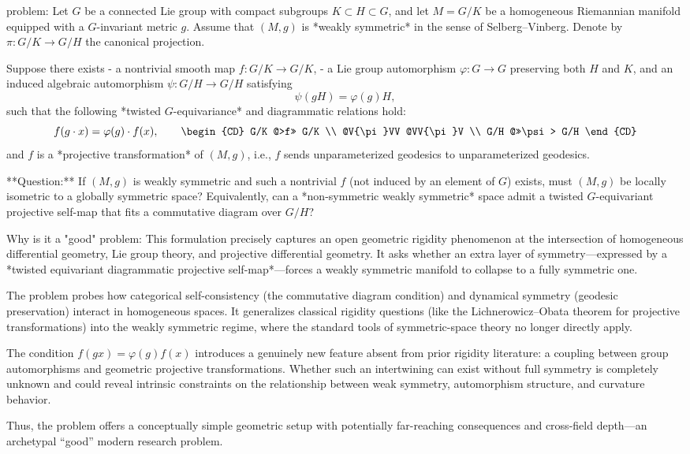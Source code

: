 problem:  
Let \(G\) be a connected Lie group with compact subgroups \(K \subset H \subset G\), and let \(M = G/K\) be a homogeneous Riemannian manifold equipped with a \(G\)-invariant metric \(g\).  
Assume that \((M,g)\) is *weakly symmetric* in the sense of Selberg–Vinberg.  
Denote by \(\pi : G/K \to G/H\) the canonical projection.  

Suppose there exists  
- a nontrivial smooth map \(f: G/K \to G/K\),  
- a Lie group automorphism \(\varphi: G \to G\) preserving both \(H\) and \(K\),  
and an induced algebraic automorphism \(\psi : G/H \to G/H\) satisfying  
\[
\psi(gH) = \varphi(g)H,
\]
such that the following *twisted \(G\)-equivariance* and diagrammatic relations hold:
\[
f(g \cdot x) = \varphi(g) \cdot f(x), \qquad
\begin{CD}
G/K @>f>> G/K \\
@V{\pi}VV  @VV{\pi}V \\
G/H @>>\psi> G/H
\end{CD}
\]
and \(f\) is a *projective transformation* of \((M,g)\), i.e., \(f\) sends unparameterized geodesics to unparameterized geodesics.  

**Question:**  
If \((M,g)\) is weakly symmetric and such a nontrivial \(f\) (not induced by an element of \(G\)) exists, must \((M,g)\) be locally isometric to a globally symmetric space?  
Equivalently, can a *non-symmetric weakly symmetric* space admit a twisted \(G\)-equivariant projective self-map that fits a commutative diagram over \(G/H\)?  

Why is it a "good" problem:  
This formulation precisely captures an open geometric rigidity phenomenon at the intersection of homogeneous differential geometry, Lie group theory, and projective differential geometry. It asks whether an extra layer of symmetry—expressed by a *twisted equivariant diagrammatic projective self-map*—forces a weakly symmetric manifold to collapse to a fully symmetric one.  

The problem probes how categorical self-consistency (the commutative diagram condition) and dynamical symmetry (geodesic preservation) interact in homogeneous spaces. It generalizes classical rigidity questions (like the Lichnerowicz–Obata theorem for projective transformations) into the weakly symmetric regime, where the standard tools of symmetric-space theory no longer directly apply.  

The condition \(f(gx) = \varphi(g)f(x)\) introduces a genuinely new feature absent from prior rigidity literature: a coupling between group automorphisms and geometric projective transformations. Whether such an intertwining can exist without full symmetry is completely unknown and could reveal intrinsic constraints on the relationship between weak symmetry, automorphism structure, and curvature behavior.  

Thus, the problem offers a conceptually simple geometric setup with potentially far-reaching consequences and cross-field depth—an archetypal “good” modern research problem.
